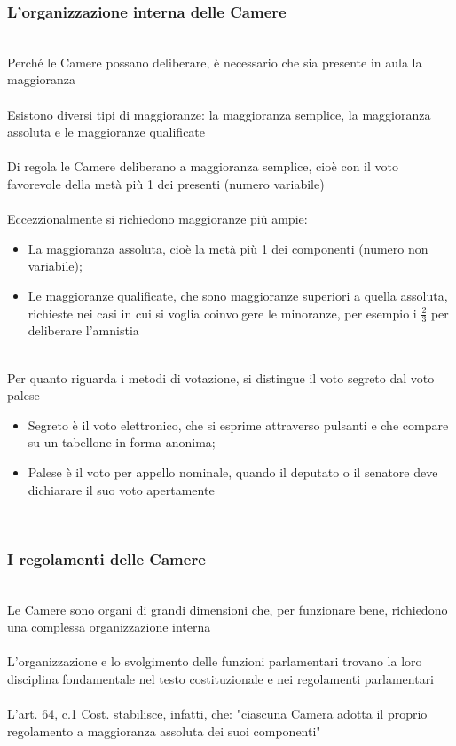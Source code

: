 \documentclass{report}
\begin{document}
\subsubsection{L'organizzazione interna delle Camere}
\\
Perché le Camere possano deliberare, è necessario che sia presente in aula la maggioranza
\\
\\
Esistono diversi tipi di maggioranze: la maggioranza semplice, la maggioranza assoluta e le maggioranze qualificate
\\
\\
Di regola le Camere deliberano a maggioranza semplice, cioè con il voto favorevole della metà più 1 dei presenti (numero variabile)
\\
\\
Eccezzionalmente si richiedono maggioranze più ampie:
\\
\begin{itemize}
  \item La maggioranza assoluta, cioè la metà più 1 dei componenti (numero non variabile);
  \item Le maggioranze qualificate, che sono maggioranze superiori a quella assoluta, richieste nei casi in cui si voglia coinvolgere le minoranze, per esempio i $\frac{2}{3}$ per deliberare l'amnistia
\end{itemize}
\\
Per quanto riguarda i metodi di votazione, si distingue il voto segreto dal voto palese
\\
\begin{itemize}
  \item Segreto è il voto elettronico, che si esprime attraverso pulsanti e che compare su un tabellone in forma anonima;
  \item Palese è il voto per appello nominale, quando il deputato o il senatore deve dichiarare il suo voto apertamente
\end{itemize}
\\
\subsubsection{I regolamenti delle Camere}
\\
Le Camere sono organi di grandi dimensioni che, per funzionare bene, richiedono una complessa organizzazione interna
\\
\\
L'organizzazione e lo svolgimento delle funzioni parlamentari trovano la loro disciplina fondamentale nel testo costituzionale e nei regolamenti parlamentari
\\
\\
L'art. 64, c.1 Cost. stabilisce, infatti, che: "ciascuna Camera adotta il proprio regolamento a maggioranza assoluta dei suoi componenti"
\\
\end{document}

